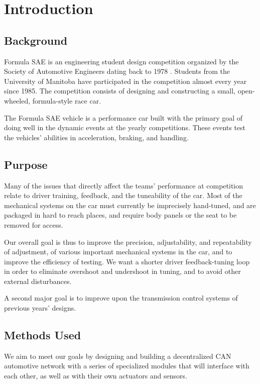 %
%
%
%

\chapter{Introduction}

\section{Background}

Formula SAE is
an engineering student design competition organized by the Society
of Automotive Engineers dating back to 1978 \cite{fsaehistory}. Students
from the University of Manitoba have participated in the competition
almost every year since 1985. The competition consists of designing
and constructing a small, open-wheeled, formula-style race car.

The Formula SAE vehicle is a performance car built with the primary goal of doing well in the dynamic events at the yearly competitions. These events test the vehicles' abilities in acceleration, braking, and handling.

\section{Purpose}

Many of the issues that directly affect the teams' performance at
competition relate to driver training, feedback, and the tuneability
of the car. Most of the mechanical systems on the car must currently
be imprecisely hand-tuned, and are packaged in hard to reach places,
and require body panels or the seat to be removed for access.

Our overall goal is thus to improve the precision, adjustability, and
repeatability of adjustment, of various important mechanical systems
in the car, and to improve the efficiency of testing. We want a shorter
driver feedback-tuning loop in order to eliminate
overshoot and undershoot in tuning, and to avoid other external disturbances.

A second major goal is to improve upon the transmission control systems
of previous years' designs.


\section{Methods Used}

We aim to meet our goals by designing and building a decentralized CAN
automotive network with a series of specialized modules that will interface
with each other, as well as with their own actuators and sensors.